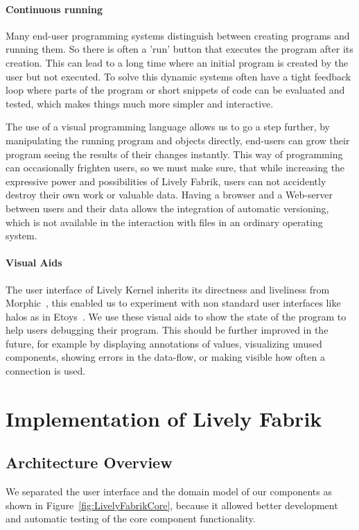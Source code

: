 \documentclass[pdftex, times, 10pt, twocolumn]{article}
\begin{document}
\paragraph{Continuous running}
Many end-user programming systems distinguish between creating programs and running them. So there is often a 'run' button that executes the program after its creation. This can lead to a long time where an initial program is created by the user but not executed. To solve this dynamic systems often have a tight feedback loop where parts of the program or short snippets of code can be evaluated and tested, which makes things much more simpler and interactive. 

The use of a visual programming language allows us to go a step further, by manipulating the running program and objects directly, end-users can grow their program seeing the results of their changes instantly. This way of programming can occasionally frighten users, so we must make sure, that while increasing the expressive power and possibilities of Lively Fabrik, users can not accidently destroy their own work or valuable data. Having a browser and a Web-server between users and their data allows the integration of automatic versioning, which is not available in the interaction with files in an ordinary operating system.  



\paragraph{Visual Aids}
The user interface of Lively Kernel inherits its directness and liveliness from Morphic~\cite{Maloney1995DLM}, this enabled us to experiment with non standard user interfaces like halos as in Etoys~\cite{Kay2005SEA}. We use these  visual aids to show the state of the program to help users debugging their program. This should be further improved in the future, for example by displaying annotations of values, visualizing unused components, showing errors in the data-flow, or making visible how often a connection is used. 



\section{Implementation of Lively Fabrik}


\subsection{Architecture Overview}
We separated the user interface and the domain model of our components as shown in Figure~\ref{fig:LivelyFabrikCore}, because it allowed better development and automatic testing of the core component functionality.  
\end{document}
